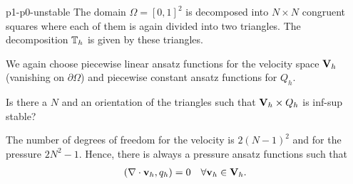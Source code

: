 \begin{Problem}{p1-p0-unstable}
The domain $\Omega=[0,1]^2$ is decomposed into $N \times N$ congruent squares where each
of them is again divided into two triangles. The decomposition $\mathbb T_h$
is given by these triangles.

We again choose piecewise linear ansatz functions for the velocity space $\mathbf V_h$
(vanishing on $\partial \Omega$) and piecewise constant ansatz functions
for $Q_h$.

Is there a $N$ and an orientation of the triangles such that $\mathbf V_h\times Q_h$ is
inf-sup stable?
\begin{solution}
  The number of degrees of freedom for the velocity is $2(N-1)^2$ and for the
  pressure $2N^2-1$. Hence, there is always a pressure ansatz functions such that
  \begin{align}
    (\nabla \cdot \mathbf v_h, q_h)=0 \quad \forall \mathbf v_h\in \mathbf V_h.
  \end{align}
\end{solution}
\end{Problem}

